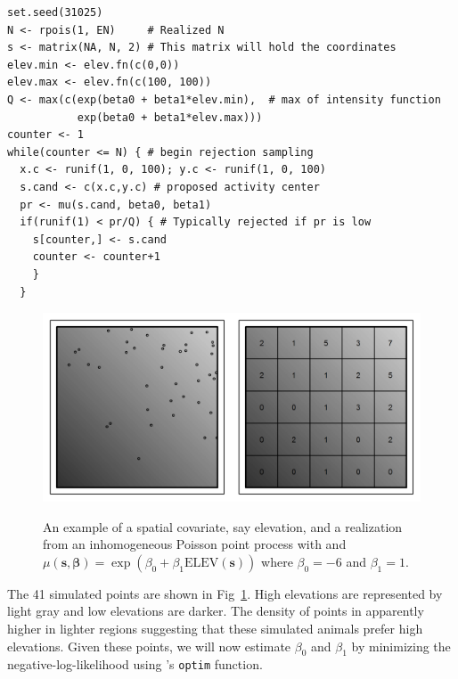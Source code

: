 \begin{samepage}
  \begin{small}
\begin{verbatim}
set.seed(31025)
N <- rpois(1, EN)     # Realized N
s <- matrix(NA, N, 2) # This matrix will hold the coordinates
elev.min <- elev.fn(c(0,0))
elev.max <- elev.fn(c(100, 100))
Q <- max(c(exp(beta0 + beta1*elev.min),  # max of intensity function
           exp(beta0 + beta1*elev.max)))
counter <- 1
while(counter <= N) { # begin rejection sampling
  x.c <- runif(1, 0, 100); y.c <- runif(1, 0, 100)
  s.cand <- c(x.c,y.c) # proposed activity center
  pr <- mu(s.cand, beta0, beta1)
  if(runif(1) < pr/Q) { # Typically rejected if pr is low
    s[counter,] <- s.cand
    counter <- counter+1
    }
  }
\end{verbatim}
  \end{small}
\end{samepage}

\begin{figure}%
\centering
\includegraphics[width=\textwidth]{Ch11/figs/heteroPlots}
\label{state-space.fig.hetero}
\caption{An example of a spatial covariate, say elevation, and a
  realization from an inhomogeneous Poisson point process with
  and $\mu(\mathbf{s}, \bm{\beta}) = \exp(\beta_0 + \beta_1
  \mbox{ELEV}(\mathbf{s}))$ where $\beta_0=-6$ and $\beta_1=1$.}
\end{figure}

The 41 simulated points are shown in
Fig~\ref{state-space.fig.hetero}. High elevations
are represented by light gray and low elevations are darker. The
density of points in apparently higher in lighter regions
suggesting that these simulated animals prefer high
elevations.  %
Given these points, we will now estimate $\beta_0$ and $\beta_1$ by
minimizing the negative-log-likelihood using \R's \verb+optim+
function.

